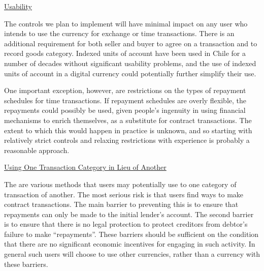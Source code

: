 \underline{Usability}

The controls we plan to implement will have minimal impact on any user who intends to use the
currency for exchange or time transactions. There is an additional requirement for both seller and
buyer to agree on a transaction and to record goods category. Indexed units of account have been
used in Chile for a number of decades without significant usability problems, and the use of indexed
units of account in a digital currency could potentially further simplify their use.

One important exception, however, are restrictions on the types of repayment schedules for time
transactions. If repayment schedules are overly flexible, the repayments could possibly be used,
given people's ingenuity in using financial mechanisms to enrich themselves, as a substitute for
contract transactions. The extent to which this would happen in practice is unknown, and so starting
with relatively strict controls and relaxing restrictions with experience is probably a reasonable
approach.

\underline{Using One Transaction Category in Lieu of Another}

The are various methods that users may potentially use to one category of transaction of another.
The most serious risk is that users find ways to make contract transactions. The main barrier to
preventing this is to ensure that repayments can only be made to the initial lender's account. The
second barrier is to ensure that there is no legal protection to protect creditors from debtor's
failure to make ``repayments''. These barriers should be sufficient on the condition that there are
no significant economic incentives for engaging in such activity. In general such users will choose to
use other currencies, rather than a currency with these barriers.

